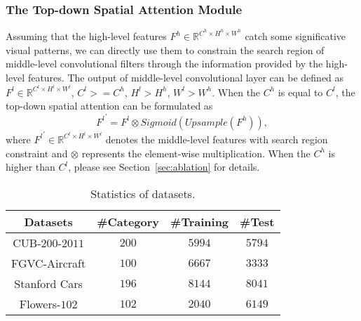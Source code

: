 \documentclass[journal]{IEEEtran}
\begin{document}










\subsubsection{The Top-down Spatial Attention Module}

Assuming that the high-level features $F^{h} \in \mathbb{R}^{C^h \times H^h \times W^h}$ catch some significative visual patterns, we can directly use them to constrain the search region of middle-level convolutional filters through the information provided by the high-level features. The output of middle-level convolutional layer can be defined as $F^l \in \mathbb{R}^{C^l \times H^l \times W^l}$, $C^l>=C^h$, $H^l>H^h$, $W^l>W^h$. When the $C^h$ is equal to $C^l$, the top-down spatial attention can be formulated as
\begin{equation}
{F^l}^{\prime} = F^l \otimes Sigmoid(Upsample(F^h)),
\end{equation}
where ${F^l}^{\prime} \in \mathbb{R}^{C^l \times H^l \times W^l}$ denotes the middle-level features with search region constraint and $\otimes$ represents the element-wise multiplication. When the $C^h$ is higher than $C^l$, please see Section~\ref{sec:ablation} for details.
\begin{table}[!t]
  \centering
  \caption{Statistics of datasets.}
    \begin{tabular}{|c|c|c|c|}
    \hline
    Datasets & \#Category & \#Training & \#Test \\
    \hline
    \hline
    CUB-$200$-$2011$ & $200$   & $5994$  & $5794$ \\
    FGVC-Aircraft    & $100$   & $6667$  & $3333$ \\
    Stanford Cars    & $196$   & $8144$  & $8041$ \\
    Flowers-$102$    & $102$   & $2040$  & $6149$ \\
   \hline
    \end{tabular}%
  \label{tab:dataset}%
\end{table}%
\end{document}
